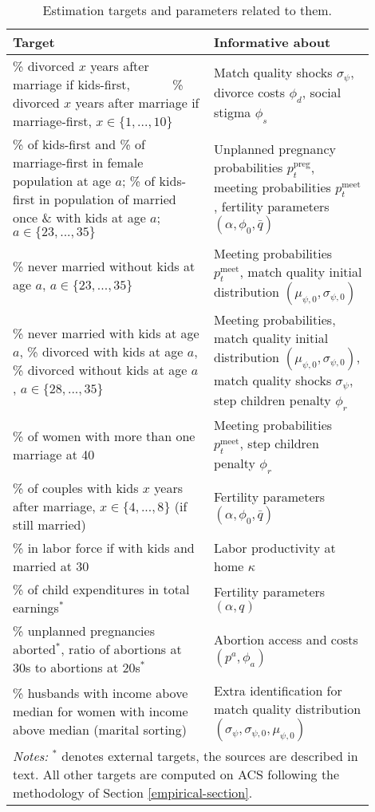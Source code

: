\documentclass[12pt,letter]{article}
\begin{document}
\begin{table}[h]
\begin{center}
\caption{\label{targets-table}Estimation targets and parameters related to them.}
{\small
\begin{tabular}{p{0.5\linewidth} p{0.4\linewidth}}
\textbf{Target} &\textbf{Informative about} \\\hline
\% divorced $x$ years after marriage if kids-first, \ \ \ \ \ \ \% divorced $x$ years after marriage if marriage-first, $x \in \{1,...,10\}$ & Match quality shocks $\sigma_\psi$, divorce costs $\phi_d$, social stigma $\phi_s$  \\\hline
\% of kids-first and \% of marriage-first in female population at age $a$; \% of kids-first in population of married once \& with kids at age $a$; $a \in \{23,...,35\}$ & Unplanned pregnancy probabilities $p^{\text{preg}}_t$, meeting probabilities $p^{\text{meet}}_t$, fertility parameters $(\alpha,\phi_0,\bar q)$\\\hline
\% never married  without kids at age $a$, $a \in \{23,...,35\}$ & Meeting probabilities $p^{\text{meet}}_t$, match quality initial distribution $(\mu_{\psi,0},\sigma_{\psi,0})$ \\\hline
\% never married with kids at age $a$, \% divorced with kids at age $a$, \% divorced without kids at age $a$, $a \in \{28,...,35\}$ & Meeting probabilities, match quality initial distribution $(\mu_{\psi,0},\sigma_{\psi,0})$, match quality shocks $\sigma_\psi$, step children penalty $\phi_r$ \\\hline
\% of women with more than one marriage at 40 & Meeting probabilities $p^{\text{meet}}_t$, step children penalty $\phi_r$ \\\hline
\% of couples with kids $x$ years after marriage, $x \in \{4,...,8\}$ (if still married) & Fertility parameters $(\alpha,\phi_0,\bar{q})$ \\\hline
\% in labor force if with kids and married at 30 & Labor productivity at home $\kappa$ \\\hline
\% of child expenditures in total earnings${}^*$ & Fertility parameters $(\alpha,q)$ \\\hline
\% unplanned pregnancies aborted${}^*$, ratio of abortions at 30s to abortions at 20s${}^*$ & Abortion access and costs $(p^a,\phi_a)$\\\hline
\% husbands with income above median for women with income above median (marital sorting) & Extra identification for match quality distribution $(\sigma_\psi,\sigma_{\psi,0},\mu_{\psi,0})$ \\\hline\hline
\multicolumn{2}{p{0.9\linewidth}}{\emph{Notes:} ${}^*$ denotes external targets, the sources are described in text. All other targets are computed on ACS following the methodology of Section \ref{empirical-section}.}\\
\hline
\end{tabular}
}
\end{center}
\end{table}
\end{document}

